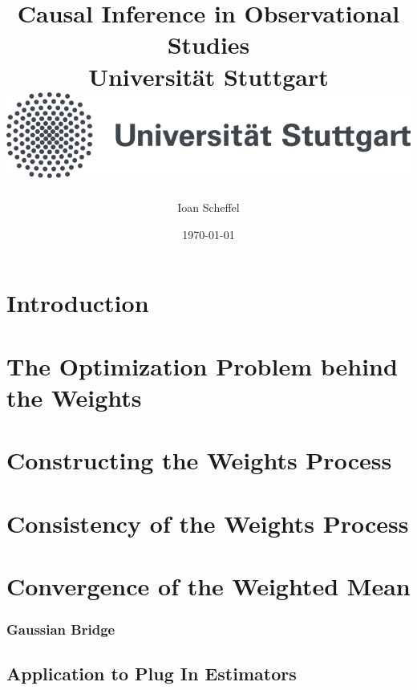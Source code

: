 \documentclass[11pt, a4paper, BCOR=10mm, DIV=11]{scrbook}
\title{
  {
    Causal Inference in Observational Studies
  }
  \\
  {\large Universität Stuttgart}
  \\
  {\includegraphics{unistuttgart_logo_deutsch.jpg}}
}
\author{Ioan Scheffel}
\date{\today}
\theoremstyle{definition}
\theoremstyle{plain}
\begin{document}
\maketitle

\tableofcontents 

\chapter{Introduction}
  
\chapter{The Optimization Problem behind the Weights}
  
\chapter{Constructing the Weights Process}
  
  
\chapter{Consistency of the Weights Process}
  

\chapter{Convergence of the Weighted Mean}
  
%  
%  
  \subsection*{Gaussian Bridge}
  
  
  \section{Application to Plug In Estimators}
  
\end{document}

